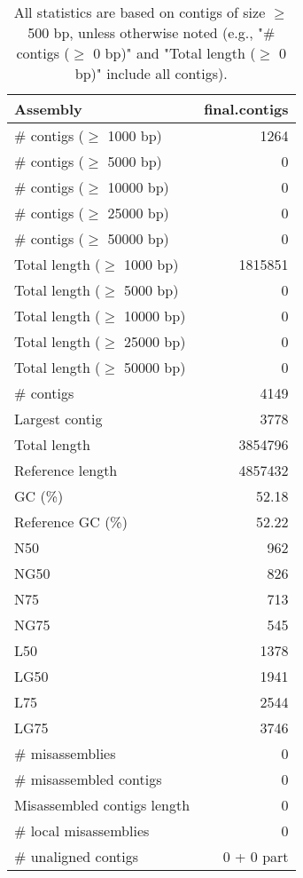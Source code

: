 \documentclass[12pt,a4paper]{article}
\begin{document}
\begin{table}[ht]
\begin{center}
\caption{All statistics are based on contigs of size $\geq$ 500 bp, unless otherwise noted (e.g., "\# contigs ($\geq$ 0 bp)" and "Total length ($\geq$ 0 bp)" include all contigs).}
\begin{tabular}{|l*{1}{|r}|}
\hline
Assembly & final.contigs \\ \hline
\# contigs ($\geq$ 1000 bp) & 1264 \\ \hline
\# contigs ($\geq$ 5000 bp) & 0 \\ \hline
\# contigs ($\geq$ 10000 bp) & 0 \\ \hline
\# contigs ($\geq$ 25000 bp) & 0 \\ \hline
\# contigs ($\geq$ 50000 bp) & 0 \\ \hline
Total length ($\geq$ 1000 bp) & 1815851 \\ \hline
Total length ($\geq$ 5000 bp) & 0 \\ \hline
Total length ($\geq$ 10000 bp) & 0 \\ \hline
Total length ($\geq$ 25000 bp) & 0 \\ \hline
Total length ($\geq$ 50000 bp) & 0 \\ \hline
\# contigs & 4149 \\ \hline
Largest contig & 3778 \\ \hline
Total length & 3854796 \\ \hline
Reference length & 4857432 \\ \hline
GC (\%) & 52.18 \\ \hline
Reference GC (\%) & 52.22 \\ \hline
N50 & 962 \\ \hline
NG50 & 826 \\ \hline
N75 & 713 \\ \hline
NG75 & 545 \\ \hline
L50 & 1378 \\ \hline
LG50 & 1941 \\ \hline
L75 & 2544 \\ \hline
LG75 & 3746 \\ \hline
\# misassemblies & 0 \\ \hline
\# misassembled contigs & 0 \\ \hline
Misassembled contigs length & 0 \\ \hline
\# local misassemblies & 0 \\ \hline
\# unaligned contigs & 0 + 0 part \\ \hline

\end{tabular}
\end{center}
\end{table}
\end{document}

